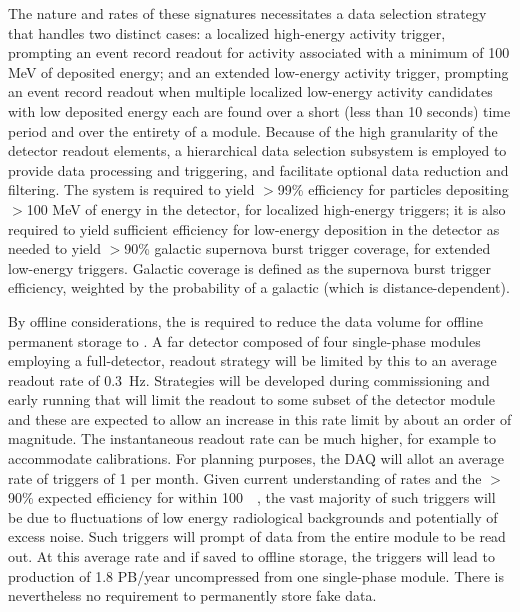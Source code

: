 The nature and rates of these signatures necessitates a data selection strategy that handles two
distinct cases: a localized high-energy activity trigger, prompting an event record readout for
activity associated with a minimum of 100 MeV of deposited energy; and an extended
low-energy activity trigger, prompting an event record readout when
multiple localized low-energy activity candidates with low deposited energy each are found over a short (less than 10
seconds) time period and over the entirety of a \nominalmodsize 
module. Because of the high granularity of the detector readout elements, a
hierarchical data selection subsystem is employed to provide data processing and
triggering, and facilitate optional data reduction and filtering. The
system is required to yield $>$99\% efficiency for particles
depositing $>$100 MeV of energy in the detector, for localized
high-energy triggers; it is also required to yield sufficient efficiency for low-energy
deposition in the detector as needed to yield $>$90\% galactic
supernova burst trigger coverage, for extended low-energy triggers. Galactic coverage is defined as
the supernova burst trigger efficiency, weighted by the probability of
a galactic  (which is  distance-dependent).

By offline considerations, the  is required to reduce the data volume for offline permanent storage to  \offsitepbpy.
A far detector composed of four single-phase modules employing a full-detector, \spreadout readout strategy will be limited by this to an average readout rate of \SI{0.3}{\hertz}. 
Strategies will be developed during commissioning and early running that will limit the readout to some subset of the detector module and these are expected to allow an increase in this rate limit by about an order of magnitude.
The instantaneous readout rate can be much higher, for example to accommodate calibrations.
For planning purposes, the DAQ will allot an average rate of  triggers of 1 per month.
Given current understanding of  rates and the $>$90\% expected efficiency for  within \SI{100}{\kilo\parsec}, the vast majority of such triggers will be due to fluctuations of low energy radiological backgrounds and potentially of excess noise.
Such triggers will prompt \snbtime of data from the entire module to be read out.
At this average rate and if saved to offline storage, the  triggers will lead to production of 1.8 PB/year uncompressed from one single-phase module. There is nevertheless no requirement to permanently store fake  data. 

